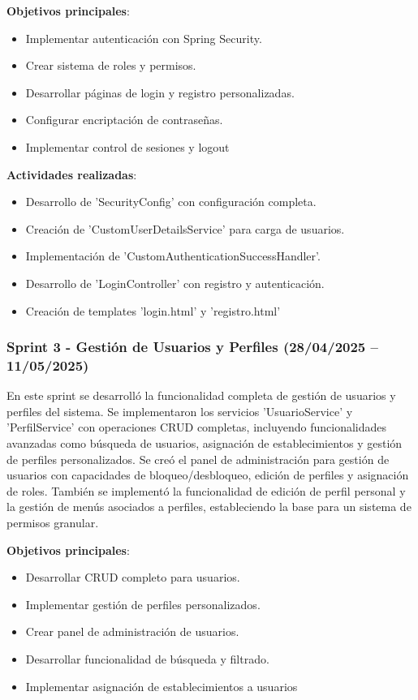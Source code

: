 \textbf{Objetivos principales}:
\begin{itemize}
\tightlist
\item
Implementar autenticación con Spring Security.
\item
Crear sistema de roles y permisos.
\item
Desarrollar páginas de login y registro personalizadas.
\item
Configurar encriptación de contraseñas.
\item
Implementar control de sesiones y logout
\end{itemize}

\textbf{Actividades realizadas}:
\begin{itemize}
\tightlist
\item
Desarrollo de 'SecurityConfig' con configuración completa.
\item
Creación de 'CustomUserDetailsService' para carga de usuarios.
\item
Implementación de 'CustomAuthenticationSuccessHandler'.
\item
Desarrollo de 'LoginController' con registro y autenticación.
\item
Creación de templates 'login.html' y 'registro.html'
\end{itemize}

\subsubsection{Sprint 3 - Gestión de Usuarios y Perfiles (28/04/2025 – 11/05/2025)} 
En este sprint se desarrolló la funcionalidad completa de gestión de usuarios y perfiles del sistema. Se implementaron los servicios 'UsuarioService' y 'PerfilService' con operaciones CRUD completas, incluyendo funcionalidades avanzadas como búsqueda de usuarios, asignación de establecimientos y gestión de perfiles personalizados. Se creó el panel de administración para gestión de usuarios con capacidades de bloqueo/desbloqueo, edición de perfiles y asignación de roles. También se implementó la funcionalidad de edición de perfil personal y la gestión de menús asociados a perfiles, estableciendo la base para un sistema de permisos granular.

\textbf{Objetivos principales}:
\begin{itemize}
\tightlist
\item
Desarrollar CRUD completo para usuarios.
\item
Implementar gestión de perfiles personalizados.
\item
Crear panel de administración de usuarios.
\item
Desarrollar funcionalidad de búsqueda y filtrado.
\item
Implementar asignación de establecimientos a usuarios
\end{itemize}

